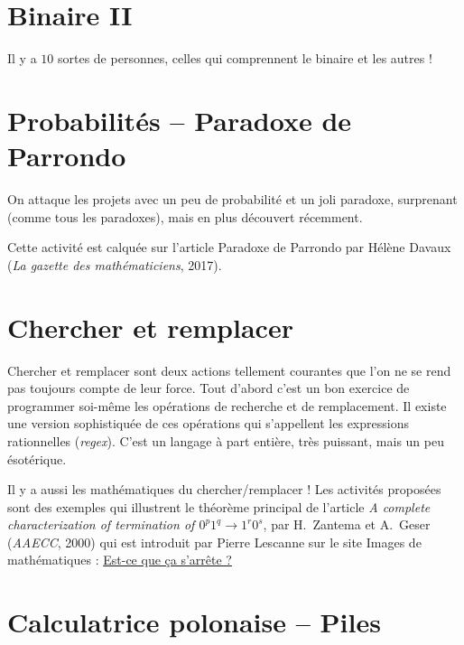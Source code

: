 \documentclass[11pt,class=report,crop=false]{standalone}
\begin{document}
\section{Binaire II}

Il y a $10$ sortes de personnes, celles qui comprennent le binaire et les autres !


\section{Probabilités – Paradoxe de Parrondo}

On attaque les projets avec un peu de probabilité et un joli paradoxe, surprenant (comme tous les paradoxes), mais en plus découvert récemment.

Cette activité est calquée sur l'article \og{} Paradoxe de Parrondo \fg{} par Hélène Davaux (\emph{La gazette des mathématiciens}, 2017).


\section{Chercher et remplacer}

Chercher et remplacer sont deux actions tellement courantes que l'on ne se rend pas toujours compte de leur force.
Tout d'abord c'est un bon exercice de programmer soi-même les opérations de recherche et de remplacement. Il existe une version sophistiquée de ces opérations qui s'appellent les expressions rationnelles (\emph{regex}). C'est un langage à part entière, très puissant, mais un peu ésotérique.

Il y a aussi les mathématiques du \og{}chercher/remplacer\fg{} ! Les activités proposées sont des exemples qui illustrent le théorème principal de l'article \emph{A complete characterization of termination of $0^p1^q \rightarrow 1^r0^s$}, par H.~Zantema et A.~Geser (\emph{AAECC}, 2000) qui est introduit par Pierre Lescanne sur le site \og{}Images de mathématiques\fg{} : 
\href{http://images.math.cnrs.fr/Est-ce-que-ca-s-arrete.html}{Est-ce que ça s'arrête ?}



\section{Calculatrice polonaise -- Piles}
\end{document}
